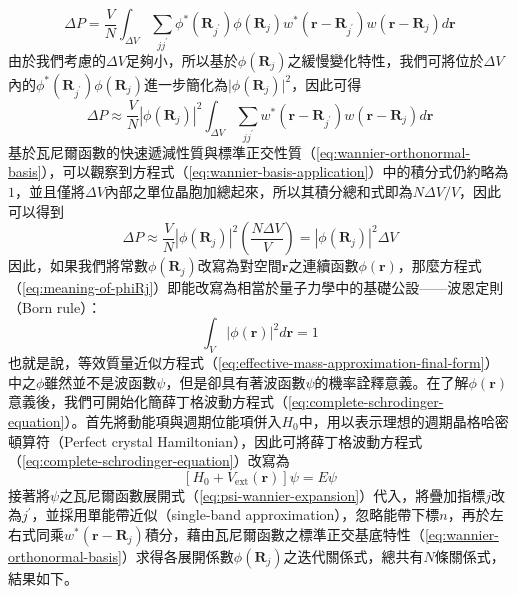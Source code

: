 \begin{equation}
\Delta P=\frac{V}{N}\int_{\Delta V}\sum_{jj^\prime}\phi^*(\mathbf{R}_{j^\prime})\phi(\mathbf{R}_j)w^*(\mathbf{r}-\mathbf{R}_{j^\prime})w(\mathbf{r}-\mathbf{R}_j)d\mathbf{r}
\end{equation}
由於我們考慮的$\Delta V$足夠小，所以基於$\phi(\mathbf{R}_j)$之緩慢變化特性，我們可將位於$\Delta V$內的$\phi^*(\mathbf{R}_{j^\prime})\phi(\mathbf{R}_j)$進一步簡化為$\vert\phi(\mathbf{R}_j)\vert^2$，因此可得
\begin{equation}
\label{eq:wannier-basis-application}
\Delta P\approx\frac{V}{N}\left\vert\phi(\mathbf{R}_j)\right\vert^2\int_{\Delta V}\sum_{jj^\prime}w^*(\mathbf{r}-\mathbf{R}_{j^\prime})w(\mathbf{r}-\mathbf{R}_j)d\mathbf{r}
\end{equation}
基於瓦尼爾函數的快速遞減性質與標準正交性質（\ref{eq:wannier-orthonormal-basis}），可以觀察到方程式（\ref{eq:wannier-basis-application}）中的積分式仍約略為$1$，並且僅將$\Delta V$內部之單位晶胞加總起來，所以其積分總和式即為$N\Delta V/V$，因此可以得到
\begin{equation}
\Delta P\approx\frac{V}{N}\left\vert\phi(\mathbf{R}_j)\right\vert^2\left(\frac{N\Delta V}{V}\right)=\left\vert\phi(\mathbf{R}_j)\right\vert^2\Delta V
\label{eq:meaning-of-phiRj}
\end{equation}
因此，如果我們將常數$\phi(\mathbf{R}_j)$改寫為對空間$\mathbf{r}$之連續函數$\phi(\mathbf{r})$，那麼方程式（\ref{eq:meaning-of-phiRj}）即能改寫為相當於量子力學中的基礎公設——波恩定則（Born rule）：
\begin{equation}
\label{eq:wannier-born-rule}
\int_V\left\vert\phi(\mathbf{r})\right\vert^2d\mathbf{r}=1
\end{equation}
也就是說，等效質量近似方程式（\ref{eq:effective-mass-approximation-final-form}）中之$\phi$雖然並不是波函數$\psi$，但是卻具有著波函數$\psi$的機率詮釋意義。在了解$\phi(\mathbf{r})$意義後，我們可開始化簡薛丁格波動方程式（\ref{eq:complete-schrodinger-equation}）。首先將動能項與週期位能項併入$H_0$中，用以表示理想的週期晶格哈密頓算符（Perfect crystal Hamiltonian），因此可將薛丁格波動方程式（\ref{eq:complete-schrodinger-equation}）改寫為
\begin{equation}
\label{eq:wannier-perturbation-form}
\left[H_0+V_\text{ext}(\mathbf{r})\right]\psi=E\psi
\end{equation}
接著將$\psi$之瓦尼爾函數展開式（\ref{eq:psi-wannier-expansion}）代入，將疊加指標$j$改為$j^\prime$，並採用單能帶近似（single-band approximation），忽略能帶下標$n$，再於左右式同乘$w^*(\mathbf{r}-\mathbf{R}_j)$積分，藉由瓦尼爾函數之標準正交基底特性（\ref{eq:wannier-orthonormal-basis}）求得各展開係數$\phi(\mathbf{R}_j)$之迭代關係式，總共有$N$條關係式，結果如下。
